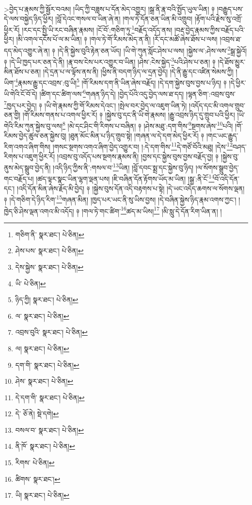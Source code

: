 >བྱེད་པ་རྣམས་ཀྱི་སྦྱོར་བའམ། །ཡིད་ཀྱི་བཟླས་པ་དོན་མེད་འགྱུར། །སྒྲ་ནི་རྣ་བའི་སྤྱོད་ཡུལ་ཡིན། ༈ །བརྒྱུད་པས་དེ་ལས་བསྐྱེད་ཉིད་ཕྱིར། །བློ་དེའང་གསལ་བ་ཡིན་ཞེ་ན། །གལ་ཏེ་དོན་ཅན་ཡིན་མི་འགྲུབ། །རྟོག་པའི་རྗེས་སུ་འགྲོ་ཕྱིར་རོ། །རང་དང་སྤྱི་ཡི་རང་བཞིན་རྣམས། །ངོ་བོ་:གཅིག་ཏུ་\footnote{གཅིག་ནི་  སྣར་ཐང་།  པེ་ཅིན། }བརྗོད་འདོད་ནས། །བརྡ་བྱེད་རྣམས་ཀྱིས་བརྗོད་པའི་ཕྱིར། །མི་འགལ་དངོས་པོ་ལ་མ་ཡིན། ༈ །གལ་ཏེ་གོ་རིམས་མེད་ན་ནི། །རོ་དང་མཚོ་ཞེས་ཐོས་པ་ལས། །འབྲས་ཐ་དད་མེད་འགྱུར་ཞེ་ན། ༈ །དེ་ནི་སྐྱེས་བུའི་རྟེན་ཅན་ཡོད། །ཡི་གེ་ཀུན་སློང་ཤེས་པ་ལས། །སྐྱེས་ལ་:ཤེས་ལས་\footnote{ཤེས་པས་  སྣར་ཐང་།  པེ་ཅིན། }སྒྲ་སྐྱེའོ། ༈ །དེ་ཡི་ཁྱད་པར་ཅན་དེ་ནི། །རྣ་བས་ངེས་པར་འགྱུར་བ་ཡིན། །ཤེས་:ངེས་སྐྱེད་\footnote{དེས་སྐྱེས་  སྣར་ཐང་།  པེ་ཅིན། }པའི་ཤེས་པ་ཅན། ༈ །དེ་ཐོས་མྱུར་མིན་ཐོས་པ་ཅན། །དེ་དྲན་པ་ལ་ལྟོས་ནས་ནི། །ཕྱིས་ནི་བདག་ཉིད་ལ་དྲན་བྱེད། །དེ་ནི་རྒྱུ་དང་འཛིན་སེམས་ཀྱི། །ཡིག་\footnote{ཡི་  པེ་ཅིན། }རྣམས་རྒྱུ་དང་འབྲས་:བུ་ཡི།\footnote{ཉིད་ཀྱི།  སྣར་ཐང་།  པེ་ཅིན། } །གོ་རིམས་དག་ནི་ཡིན་ཞེས་བརྗོད། །དེ་དག་སྐྱེས་བུས་བྱས་པ་ཉིད། ༈ །དེ་ཕྱིར་ཡི་གེའི་ངོ་བོ་དེ། །ཚིག་དང་ཚིག་ལས་\footnote{ལ་  སྣར་ཐང་།  པེ་ཅིན། }གཞན་ཉིད་དེ། །བྱེད་པོའི་འདུ་བྱེད་ལས་ཐ་དད། །ལྷན་ཅིག་:འབྲས་བུས་\footnote{འབྲས་བུའི་  སྣར་ཐང་།  པེ་ཅིན། }ཁྱད་པར་བྱེད། ༈ །ཡི་གེ་རྣམས་ཀྱི་གོ་རིམས་དེའང་། །སྤེལ་བར་བྱེད་ལ་འཇུག་ཡིན་ཏེ། །འདོད་དང་མི་འགལ་གྲུབ་ཅན་གྱི། །གོ་རིམས་གནས་པ་འགལ་ཕྱིར་རོ། ༈ །སྐྱེས་བུ་དང་ནི་ཡི་གེ་རྣམས། །རྒྱུ་འབྲས་ཉིད་དུ་གྲུབ་པའི་ཕྱིར། །ཡི་གེའི་རིམ་ཀུན་སྐྱེས་བུ་ལས།\footnote{ལ།  སྣར་ཐང་།  པེ་ཅིན། } །མེ་དང་ཤིང་གི་རིགས་པ་བཞིན། ༈ །ཤེས་མཐུ་:དག་གིས་\footnote{དག་གི་  སྣར་ཐང་།  པེ་ཅིན། }སྔགས་ཞེས་\footnote{ཤེས་  སྣར་ཐང་།  པེ་ཅིན། }པའི། །གོ་རིམས་བྱེད་ཚུལ་ཅན་སྐྱེས་བུ། །ཐུན་མོང་མིན་པ་ཉིད་གྲུབ་སྟེ། །གཞན་ལ་དེ་དག་མེད་ཕྱིར་རོ། ༈ །གང་ཡང་རྒྱུད་རིག་འགའ་ཞིག་གིས། །གསང་སྔགས་འགའ་ཞིག་བྱེད་འགྱུར་བ། །:དེ་དག་གིས་\footnote{དེ་དག་གི་  སྣར་ཐང་།  པེ་ཅིན། }དེ་གཙོ་བོའི་མཐུ། །དེས་\footnote{དེ་  ཅོ་ནེ།  སྡེ་དགེ། }བཤད་རིགས་པ་འཇུག་ཕྱིར་རོ། །འབྲས་བུ་འདོད་པས་སྔགས་རྣམས་ནི། །བྱས་དང་སྐྱེས་བུས་བྱས་བརྗོད་བྱ། ༈ །སྐྱེས་བུ་ནུས་མེད་སྒྲུབ་བྱེད་ནི། །འདི་ཉིད་ཀྱིས་ནི་:གསལ་བ་\footnote{བསལ་བ་  སྣར་ཐང་།  པེ་ཅིན། }ཡིན། །བློ་དབང་སྨྲ་དང་སྐྱེས་བུ་ཉིད། །ལ་སོགས་སྒྲུབ་བྱེད་གང་བརྗོད་པ། །ཚད་ལྟར་སྣང་ཡིན་ལྷག་ལྡན་པས། །ཇི་བཞིན་དོན་རྟོགས་ཡོད་མ་ཡིན། །སྒྲ་:ནི་ངོ་\footnote{ནི་ཁོ་  སྣར་ཐང་།  པེ་ཅིན། }བོ་འདི་དོན་དང་། །འདི་དོན་མིན་ཞེས་རྗོད་མི་བྱེད། ༈ །སྐྱེས་བུས་དོན་འདི་བརྟགས་པ་སྟེ། །དེ་ཡང་འདོད་ཆགས་ལ་སོགས་ལྡན། ༈ །དེ་གཅིག་དེ་ཉིད་རིག་\footnote{རིགས་  པེ་ཅིན། }གཞན་མིན། །ཁྱད་པར་ཡང་ནི་སུ་ཡིས་བྱས། །དེ་བཞིན་སྐྱེས་ཉིད་རྣམ་འགས་ཀྱང་། །ཁྱེད་ཅི་ཤེས་ལྡན་འགའ་མི་འདོད། ༈ །གལ་ཏེ་གང་ཚིག་\footnote{ཚིགས་  སྣར་ཐང་། }ཚད་མ་ཡིས།\footnote{ཡི།  སྣར་ཐང་།  པེ་ཅིན། } །མི་སླུ་དེ་དོན་རིག་ཡིན་ན། །
